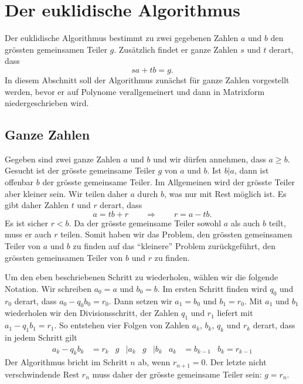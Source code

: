%
%
%
\section{Der euklidische Algorithmus}
Der euklidische Algorithmus bestimmt zu zwei gegebenen Zahlen $a$ und $b$
den grössten gemeinsamen Teiler $g$.
Zusätzlich findet er ganze Zahlen $s$ und $t$ derart, dass
\[
sa + tb = g.
\]
In diesem Abschnitt soll der Algorithmus zunächst für ganze Zahlen
vorgestellt werden, bevor er auf Polynome verallgemeinert und dann
in Matrixform niedergeschrieben wird.

\subsection{Ganze Zahlen}
Gegeben sind zwei ganze Zahlen $a$ und $b$ und wir dürfen annehmen,
dass $a\ge b$.
Gesucht ist der grösste gemeinsame Teiler $g$ von $a$ und $b$.
Ist $b|a$, dann ist offenbar $b$ der grösste gemeinsame Teiler.
Im Allgemeinen wird der grösste Teiler aber kleiner sein.
Wir teilen daher $a$ durch $b$, was nur mit Rest möglich ist.
Es gibt daher Zahlen $t$ und $r$ derart, dass
\[
a = tb+ r
\qquad \Rightarrow \qquad
r = a - tb.
\]
Es ist sicher $r < b$.
Da der grösste gemeinsame Teiler sowohl $a$ als auch $b$ teilt, muss er
auch $r$ teilen.
Somit haben wir das Problem, den grössten gemeinsamen Teiler von $a$ und
$b$ zu finden auf das ``kleinere'' Problem zurückgeführt, den grössten
gemeinsamen Teiler von $b$ und $r$ zu finden.

Um den eben beschriebenen Schritt zu wiederholen, wählen wir die folgende
Notation.
Wir schreiben $a_0=a$ und $b_0=b$.
Im ersten Schritt finden wird $q_0$ und $r_0$ derart,
dass $a_0-q_0b_0 = r_0$.
Dann setzen wir $a_1=b_0$ und $b_1=r_0$.
Mit $a_1$ und $b_1$ wiederholen wir den Divisionsschritt, der Zahlen
$q_1$ und $r_1$ liefert mit $a_1-q_1b_1=r_1$.
So entstehen vier Folgen von Zahlen $a_k$, $b_k$, $q_k$ und $r_k$ derart,
dass in jedem Schritt gilt
\begin{align*}
a_k - q_kb_k &= r_k & g&|a_k & g&|b_k & a_k &= b_{k-1} & b_k = r_{k-1}
\end{align*}
Der Algorithmus bricht im Schritt $n$ ab, wenn $r_{n+1}=0$.
Der letzte nicht verschwindende Rest $r_n$ muss daher der grösste gemeinsame
Teiler sein: $g=r_n$.

